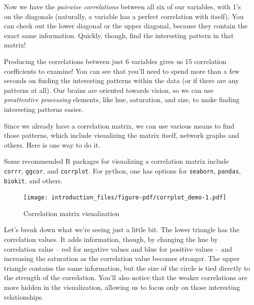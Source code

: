 \documentclass[
  letterpaper,
]{krantz}
\begin{document}
Now we have the \emph{pairwise correlations} between all six of our
variables, with 1's on the diagonals (naturally, a variable has a
perfect correlation with itself). You can check out the lower diagonal
or the upper diagonal, because they contain the exact same information.
Quickly, though, find the interesting pattern in that matrix!

Producing the correlations between just 6 variables gives us 15
correlation coefficients to examine! You can see that you'll need to
spend more than a few seconds on finding the interesting patterns within
the data (or if there are any patterns at all). Our brains are oriented
towards vision, so we can use \emph{preattentive processing} elements,
like hue, saturation, and size, to make finding interesting patterns
easier.

Since we already have a correlation matrix, we can use various means to
find those patterns, which include visualizing the matrix itself,
network graphs and others. Here is one way to do it.

\begin{tcolorbox}[enhanced jigsaw, bottomrule=.15mm, rightrule=.15mm, colframe=quarto-callout-note-color-frame, colback=white, breakable, arc=.35mm, left=2mm, opacityback=0, leftrule=.75mm, toprule=.15mm]

Some recommended R packages for visualizing a correlation matrix include
\texttt{corrr}, \texttt{ggcor}, and \texttt{corrplot}. For python, one
has options for \texttt{seaborn}, \texttt{pandas}, \texttt{biokit}, and
others.

\end{tcolorbox}

\begin{figure}[H]

{\centering \texttt{[image: introduction\_files/figure-pdf/corrplot\_demo-1.pdf]}

}

\caption{Correlation matrix visualization}

\end{figure}%

Let's break down what we're seeing just a little bit. The lower triangle
has the correlation values. It adds information, though, by changing the
hue by correlation value -- red for negative values and blue for
positive values -- and increasing the saturation as the correlation
value becomes stronger. The upper triangle contains the same
information, but the size of the circle is tied directly to the strength
of the correlation. You'll also notice that the weaker correlations are
more hidden in the visualization, allowing us to focus only on those
interesting relationships.
\end{document}
